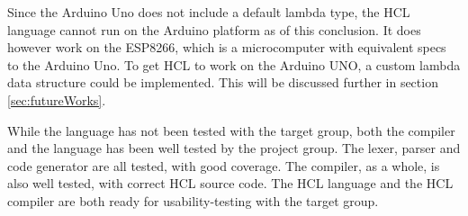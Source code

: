 Since the Arduino Uno does not include a default lambda type, the HCL language cannot run on the Arduino platform as of this conclusion.
It does however work on the ESP8266, which is a microcomputer with equivalent specs to the Arduino Uno.
To get HCL to work on the Arduino UNO, a custom lambda data structure could be implemented.
This will be discussed further in section \ref{sec:futureWorks}.

While the language has not been tested with the target group, both the compiler and the language has been well tested by the project group.
The lexer, parser and code generator are all tested, with good coverage.
The compiler, as a whole, is also well tested, with correct HCL source code.
The HCL language and the HCL compiler are both ready for usability-testing with the target group.



